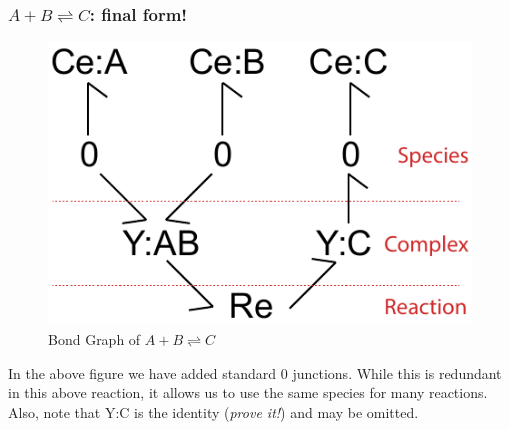 \documentclass[10pt,reqno]{beamer}
\begin{document}
\begin{frame}
\frametitle{$A+B\rightleftharpoons C$: final form!}
\begin{figure}
	\includegraphics[scale=0.75]{images/bondgraph_abc}
	\caption{Bond Graph of $A+B \rightleftharpoons C$}
\end{figure}
In the above figure we have added standard 0 junctions. While this is redundant in this above reaction, it allows us to use the same species for many reactions.
Also, note that $\text{Y:C}$ is the identity (\emph{prove it!}) and may be omitted.
\end{frame}
\end{document}
